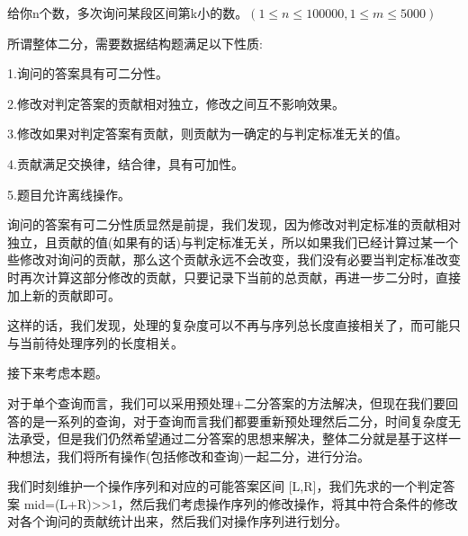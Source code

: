 给你n个数，多次询问某段区间第k小的数。$(1 \le n \le 100000, 1 \le m \le 5000)$

所谓整体二分，需要数据结构题满足以下性质:

1.询问的答案具有可二分性。

2.修改对判定答案的贡献相对独立，修改之间互不影响效果。

3.修改如果对判定答案有贡献，则贡献为一确定的与判定标准无关的值。

4.贡献满足交换律，结合律，具有可加性。

5.题目允许离线操作。

询问的答案有可二分性质显然是前提，我们发现，因为修改对判定标准的贡献相对独立，且贡献的值(如果有的话)与判定标准无关，所以如果我们已经计算过某一个些修改对询问的贡献，那么这个贡献永远不会改变，我们没有必要当判定标准改变时再次计算这部分修改的贡献，只要记录下当前的总贡献，再进一步二分时，直接加上新的贡献即可。

这样的话，我们发现，处理的复杂度可以不再与序列总长度直接相关了，而可能只与当前待处理序列的长度相关。


接下来考虑本题。

对于单个查询而言，我们可以采用预处理+二分答案的方法解决，但现在我们要回答的是一系列的查询，对于查询而言我们都要重新预处理然后二分，时间复杂度无法承受，但是我们仍然希望通过二分答案的思想来解决，整体二分就是基于这样一种想法，我们将所有操作(包括修改和查询)一起二分，进行分治。

我们时刻维护一个操作序列和对应的可能答案区间 [L,R]，我们先求的一个判定答案 mid=(L+R)>>1，然后我们考虑操作序列的修改操作，将其中符合条件的修改对各个询问的贡献统计出来，然后我们对操作序列进行划分。